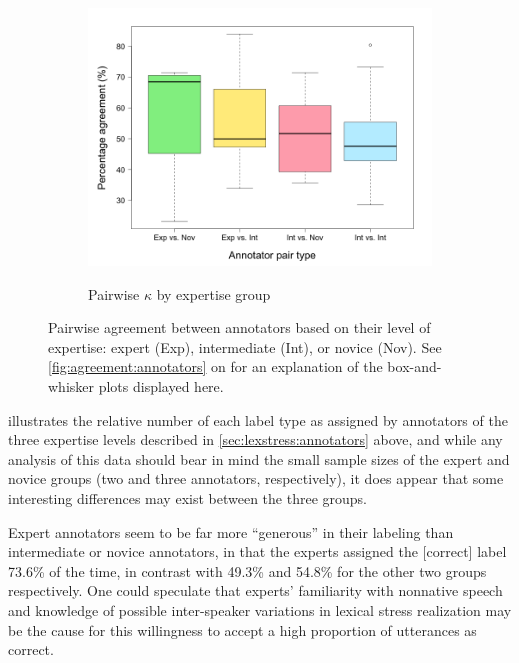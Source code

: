 \begin{figure}[p]
			\begin{subfigure}{\textwidth}
				\centering
				\caption{Pairwise $\kappa$ by expertise group}
				\includegraphics[width=\textwidth]{img/plots/pairwisePctByExpertise-noTitle}
				\label{fig:agreement:expertise:k}
			\end{subfigure}%
			
			\caption[Pairwise agreement statistics by annotator expertise]{Pairwise agreement between annotators based on their level of expertise: expert (Exp), intermediate (Int), or novice (Nov). 
			See \cref{fig:agreement:annotators} on  for an explanation of the box-and-whisker plots displayed here.
			}
			\label{fig:agreement:expertise}
		\end{figure}
		
			 illustrates the relative number of each label type as assigned by annotators of the three expertise levels described in \cref{sec:lexstress:annotators} above, and while any analysis of this data should bear in mind the small sample sizes of the expert and novice groups (two and three annotators, respectively), it does appear that some interesting differences may exist between the three groups. 
			
			Expert annotators seem to be far more ``generous'' in their labeling than intermediate or novice annotators, in that the experts assigned the [correct] label 73.6\% of the time, in contrast with 49.3\% and 54.8\% for the other two groups respectively. One could speculate that experts' familiarity with nonnative speech and knowledge of possible inter-speaker variations in lexical stress realization may be the cause for this willingness to accept a high proportion of utterances as correct. 
			
